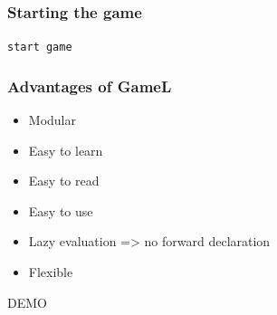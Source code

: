 \documentclass{beamer}
\begin{document}
\begin{frame}[fragile]
    \frametitle{Starting the game}
    \begin{center}
        \huge{
            \texttt{start game}
        }
    \end{center}
\end{frame}

\begin{frame}
    \frametitle{Advantages of GameL}
    \begin{itemize}[<+->]
        \item{Modular}
        \item{Easy to learn}
        \item{Easy to read}
        \item{Easy to use}
        \item{Lazy evaluation => no forward declaration}
        \item{Flexible}
    \end{itemize}
\end{frame}

\begin{frame}[plain,c]
    \begin{center}
        \Huge DEMO
    \end{center}
\end{frame}
\end{document}
